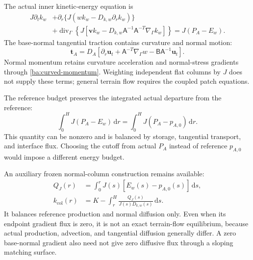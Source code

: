 \documentclass[11pt,a4paper]{article}
\numberwithin{equation}{section}
\begin{document}
The actual inner kinetic-energy equation is
\begin{equation}
 \boxed{\begin{aligned}
 J\partial_t k_w
 &+\partial_r\{J(wk_w-D_{k,w}\partial_rk_w)\}\\
 &+\operatorname{div}_\Gamma\left\{
 J[\boldsymbol v k_w-D_{k,w}\mathsf A^{-1}\mathsf A^{-T}
                                 \nabla_\Gamma k_w]\right\}
 =J(P_A-E_w).
 \end{aligned}}
 \label{ba:curved-k}
\end{equation}
The base-normal tangential traction contains curvature and normal motion:
\begin{equation}
 \boldsymbol t_A=D_A\left[
 \partial_r\boldsymbol u_t+\mathsf A^{-T}\nabla_\Gamma w
 -\mathsf B\mathsf A^{-1}\boldsymbol u_t\right].
 \label{ba:curved-traction}
\end{equation}
Normal momentum retains curvature acceleration and normal-stress gradients
through \eqref{ba:curved-momentum}. Weighting independent flat columns
by $J$ does not supply these terms; general terrain flow requires the
coupled patch equations.

The reference budget preserves the integrated actual departure from the
reference:
\begin{equation}
 \int_0^HJ(P_A-E_w)\,\mathrm dr
 =\int_0^HJ(P_A-p_{A,0})\,\mathrm dr.
 \label{ba:actual-budget}
\end{equation}
This quantity can be nonzero and is balanced by storage, tangential
transport, and interface flux. Choosing the cutoff from actual $P_A$
instead of reference $p_{A,0}$ would impose a different energy budget.

An auxiliary frozen normal-column construction remains available:
\begin{equation}
 \begin{aligned}
 Q_J(r)&=\int_0^rJ(s)[E_w(s)-p_{A,0}(s)]\,\mathrm ds,\\
 k_{\mathrm{col}}(r)&=K-\int_r^H
               \frac{Q_J(s)}{J(s)D_{k,w}(s)}\,\mathrm ds.
 \end{aligned}
 \label{ba:curved-column}
\end{equation}
It balances reference production and normal diffusion only. Even when
its endpoint gradient flux is zero, it is not an exact terrain-flow
equilibrium, because actual production, advection, and tangential
diffusion generally differ. A zero base-normal gradient also need not
give zero diffusive flux through a sloping matching surface.
\end{document}
